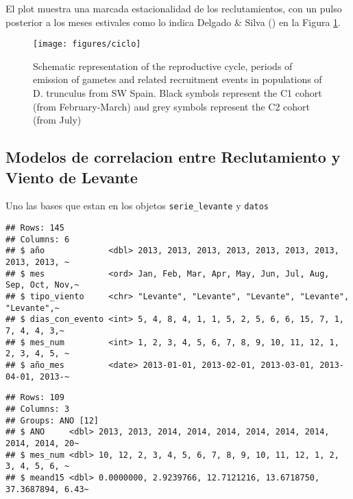 \documentclass[
]{article}
\begin{document}
El plot muestra una marcada estacionalidad de los reclutamientos, con un pulso posterior a los meses estivales como lo indica Delgado \& Silva () en la Figura \ref{fig:ciclo}.

\begin{figure}

{\centering \texttt{[image: figures/ciclo]} 

}

\caption{Schematic representation of the reproductive cycle, periods of emission of gametes and related recruitment events in populations of D. trunculus from SW Spain. Black symbols represent the C1 cohort (from February-March) and grey symbols represent the C2 cohort (from July)}\label{fig:ciclo}
\end{figure}
\newpage

\subsection{Modelos de correlacion entre Reclutamiento y Viento de Levante}\label{modelos-de-correlacion-entre-reclutamiento-y-viento-de-levante}

Uno las bases que estan en los objetos \texttt{serie\_levante} y \texttt{datos}

\begin{verbatim}
## Rows: 145
## Columns: 6
## $ año             <dbl> 2013, 2013, 2013, 2013, 2013, 2013, 2013, 2013, 2013, ~
## $ mes             <ord> Jan, Feb, Mar, Apr, May, Jun, Jul, Aug, Sep, Oct, Nov,~
## $ tipo_viento     <chr> "Levante", "Levante", "Levante", "Levante", "Levante",~
## $ dias_con_evento <int> 5, 4, 8, 4, 1, 1, 5, 2, 5, 6, 6, 15, 7, 1, 7, 4, 4, 3,~
## $ mes_num         <int> 1, 2, 3, 4, 5, 6, 7, 8, 9, 10, 11, 12, 1, 2, 3, 4, 5, ~
## $ año_mes         <date> 2013-01-01, 2013-02-01, 2013-03-01, 2013-04-01, 2013-~
\end{verbatim}

\begin{verbatim}
## Rows: 109
## Columns: 3
## Groups: ANO [12]
## $ ANO     <dbl> 2013, 2013, 2014, 2014, 2014, 2014, 2014, 2014, 2014, 2014, 20~
## $ mes_num <dbl> 10, 12, 2, 3, 4, 5, 6, 7, 8, 9, 10, 11, 12, 1, 2, 3, 4, 5, 6, ~
## $ meand15 <dbl> 0.0000000, 2.9239766, 12.7121216, 13.6718750, 37.3687894, 6.43~
\end{verbatim}
\end{document}

